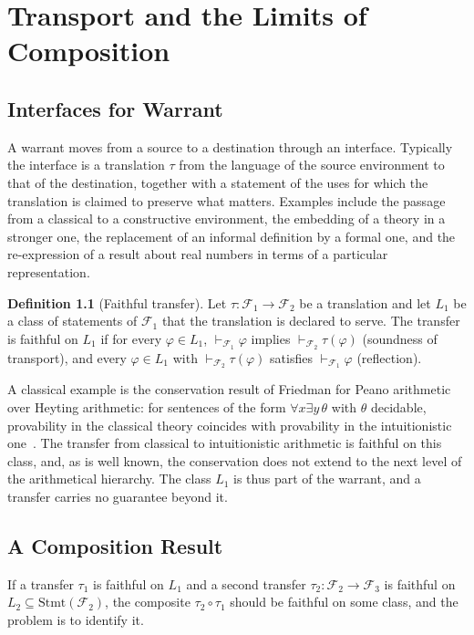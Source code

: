 \documentclass[11pt]{book}
\theoremstyle{definition}
\newtheorem{definition}[theorem]{Definition}
\theoremstyle{remark}
\newcommand{\Fenv}{\mathcal{F}}
\begin{document}
\chapter{Transport and the Limits of Composition}

\section{Interfaces for Warrant}

A warrant moves from a source to a destination through an interface. Typically the interface is a translation $\tau$ from the language of the source environment to that of the destination, together with a statement of the uses for which the translation is claimed to preserve what matters. Examples include the passage from a classical to a constructive environment, the embedding of a theory in a stronger one, the replacement of an informal definition by a formal one, and the re-expression of a result about real numbers in terms of a particular representation.

\begin{definition}[Faithful transfer]
Let $\tau\colon \Fenv_1\to\Fenv_2$ be a translation and let $L_1$ be a class of statements of $\Fenv_1$ that the translation is declared to serve. The transfer is faithful on $L_1$ if for every $\varphi\in L_1$, $\vdash_{\Fenv_1}\varphi$ implies $\vdash_{\Fenv_2}\tau(\varphi)$ (soundness of transport), and every $\varphi\in L_1$ with $\vdash_{\Fenv_2}\tau(\varphi)$ satisfies $\vdash_{\Fenv_1}\varphi$ (reflection).
\end{definition}

A classical example is the conservation result of Friedman for Peano arithmetic over Heyting arithmetic: for sentences of the form $\forall x\exists y\,\theta$ with $\theta$ decidable, provability in the classical theory coincides with provability in the intuitionistic one~\cite{friedman}. The transfer from classical to intuitionistic arithmetic is faithful on this class, and, as is well known, the conservation does not extend to the next level of the arithmetical hierarchy. The class $L_1$ is thus part of the warrant, and a transfer carries no guarantee beyond it.

\section{A Composition Result}

If a transfer $\tau_1$ is faithful on $L_1$ and a second transfer $\tau_2\colon\Fenv_2\to\Fenv_3$ is faithful on $L_2\subseteq\mathrm{Stmt}(\Fenv_2)$, the composite $\tau_2\circ\tau_1$ should be faithful on some class, and the problem is to identify it.
\end{document}
